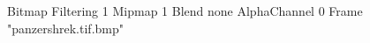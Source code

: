 {Bitmap
	{Filtering 1}
	{Mipmap 1}
	{Blend none}
	{AlphaChannel 0}
	{Frame "panzershrek.tif.bmp"}
}
